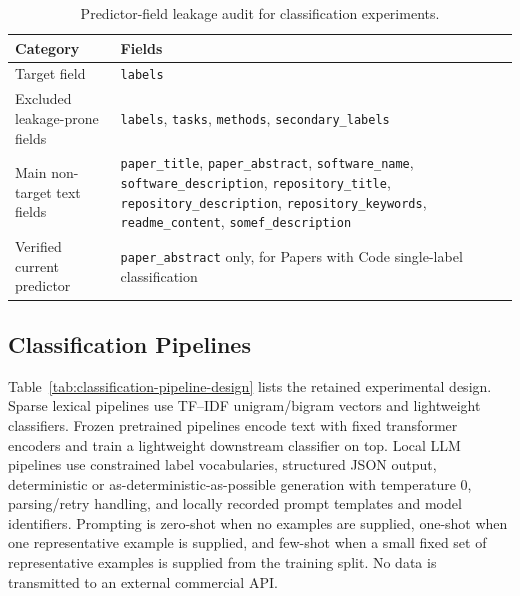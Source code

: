\documentclass[pdflatex,sn-mathphys-num]{sn-jnl}
\theoremstyle{thmstyleone}%
\theoremstyle{thmstyletwo}%
\theoremstyle{thmstylethree}%
\begin{document}
\begin{table}[htbp]
\centering
\small
\caption{Predictor-field leakage audit for classification experiments.}
\label{tab:leakage-audit}
\begin{tabularx}{\textwidth}{p{3.5cm}Y}
\toprule
Category & Fields \\
\midrule
Target field & \texttt{labels} \\
Excluded leakage-prone fields & \texttt{labels}, \texttt{tasks}, \texttt{methods}, \texttt{secondary\_labels} \\
Main non-target text fields & \texttt{paper\_title}, \texttt{paper\_abstract}, \texttt{software\_name}, \texttt{software\_description}, \texttt{repository\_title}, \texttt{repository\_description}, \texttt{repository\_keywords}, \texttt{readme\_content}, \texttt{somef\_description} \\
Verified current predictor & \texttt{paper\_abstract} only, for Papers with Code single-label classification \\
\bottomrule
\end{tabularx}
\end{table}

\subsection{Classification Pipelines}
\label{subsec:classification-pipelines}

Table~\ref{tab:classification-pipeline-design} lists the retained experimental design. Sparse lexical pipelines use TF--IDF unigram/bigram vectors and lightweight classifiers. Frozen pretrained pipelines encode text with fixed transformer encoders and train a lightweight downstream classifier on top. Local LLM pipelines use constrained label vocabularies, structured JSON output, deterministic or as-deterministic-as-possible generation with temperature 0, parsing/retry handling, and locally recorded prompt templates and model identifiers. Prompting is zero-shot when no examples are supplied, one-shot when one representative example is supplied, and few-shot when a small fixed set of representative examples is supplied from the training split. No data is transmitted to an external commercial API.
\end{document}

